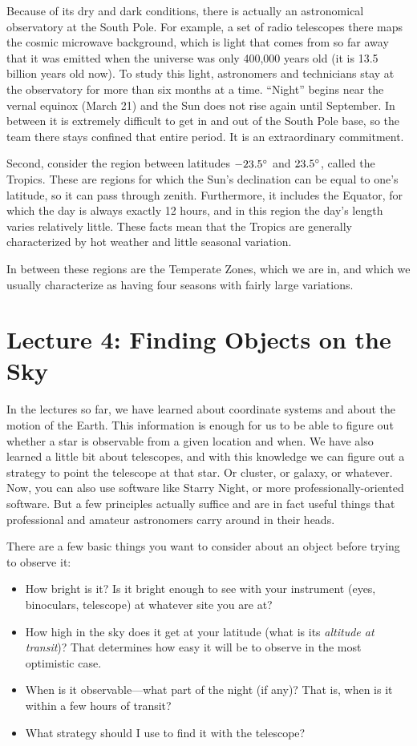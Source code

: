 \documentclass[12pt, preprint]{aastex}
\begin{document}
Because of its dry and dark conditions, there is actually an
astronomical observatory at the South Pole. For example, a set of
radio telescopes there maps the cosmic microwave background, which is
light that comes from so far away that it was emitted when the
universe was only 400,000 years old (it is 13.5 billion years old
now).  To study this light, astronomers and technicians stay at the
observatory for more than six months at a time. ``Night'' begins near
the vernal equinox (March 21) and the Sun does not rise again until
September. In between it is extremely difficult to get in and out of
the South Pole base, so the team there stays confined that entire
period. It is an extraordinary commitment.

Second, consider the region between latitudes $-23.5{}^\circ$ and
$23.5{}^\circ$, called the Tropics. These are regions for which the
Sun's declination can be equal to one's latitude, so it can pass
through zenith. Furthermore, it includes the Equator, for which the
day is always exactly 12 hours, and in this region the day's length
varies relatively little. These facts mean that the Tropics are
generally characterized by hot weather and little seasonal variation.

In between these regions are the Temperate Zones, which we are in, and
which we usually characterize as having four seasons with fairly large
variations.

\clearpage
\section{Lecture 4: Finding Objects on the Sky}

In the lectures so far, we have learned about coordinate systems and
about the motion of the Earth. This information is enough for us to be
able to figure out whether a star is observable from a given location
and when. We have also learned a little bit about telescopes, and with
this knowledge we can figure out a strategy to point the telescope at
that star. Or cluster, or galaxy, or whatever. Now, you can also use
software like Starry Night, or more professionally-oriented software.
But a few principles actually suffice and are in fact useful things
that professional and amateur astronomers carry around in their heads.

There are a few basic things you want to consider about an object
before trying to observe it:
\begin{itemize}
  \item How bright is it? Is it bright enough to see with your
    instrument (eyes, binoculars, telescope) at whatever site you are
    at?
  \item How high in the sky does it get at your latitude
    (what is its {\it altitude at transit})? That determines how easy
    it will be to observe in the most optimistic case.
  \item When is it observable---what part of the night (if any)? That
    is, when is it within a few hours of transit?
  \item What strategy should I use to find it with the telescope? 
\end{itemize}
\end{document}
